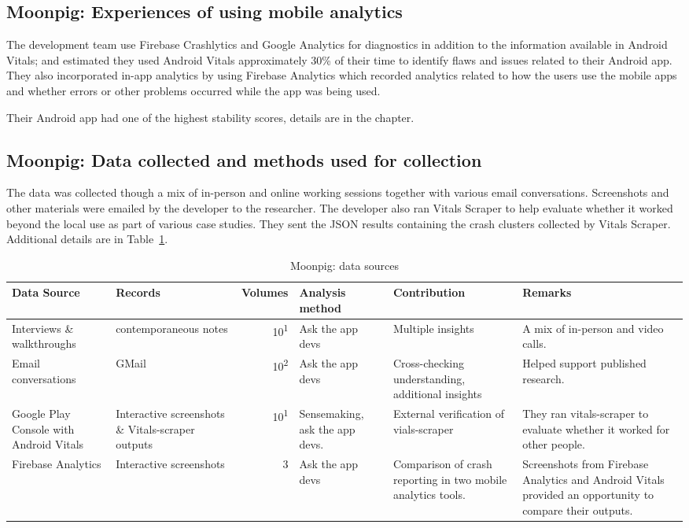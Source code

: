 \subsection{Moonpig: Experiences of using mobile analytics}
The development team use Firebase Crashlytics and Google Analytics for diagnostics in addition to the information available in Android Vitals; and estimated they used Android Vitals approximately 30\% of their time to identify flaws and issues related to their Android app.
%
They also incorporated in-app analytics by using Firebase Analytics which recorded analytics related to how the users use the mobile apps and whether errors or other problems occurred while the app was being used. 

Their Android app had one of the highest stability scores, details are in the  chapter.

\subsection{Moonpig: Data collected and methods used for collection}
The data was collected though a mix of in-person and online working sessions together with various email conversations. Screenshots and other materials were emailed by the developer to the researcher. 
%
The developer also ran Vitals Scraper to help evaluate whether it worked beyond the local use as part of various case studies. They sent the JSON results containing the crash clusters collected by Vitals Scraper. Additional details are in Table~\ref{tab:moonpig-data-sources}.

\begin{table}
    \centering
    \footnotesize
    \tabcolsep=0.12cm
    \begin{tabular}{p{2.2cm}p{2.3cm}rp{2.1cm}p{2.5cm}p{4cm}}
        Data Source & Records & Volumes & Analysis method & Contribution & Remarks \\
        \toprule
         Interviews \& walkthroughs & contemporaneous notes & 10\textsuperscript{1} & Ask the app devs & Multiple insights & A mix of in-person and video calls.  \\
         Email conversations & GMail & 10\textsuperscript{2} & Ask the app devs & Cross-checking understanding, additional insights & Helped support published research. \\
         Google Play Console with Android Vitals &Interactive screenshots \& Vitals-scraper outputs &10\textsuperscript{1} & Sensemaking, ask the app devs. & External verification of vials-scraper & They ran vitals-scraper to evaluate whether it worked for other people. \\
         Firebase Analytics & Interactive screenshots & 3 & Ask the app devs & Comparison of crash reporting in two mobile analytics tools. & Screenshots from Firebase Analytics and Android Vitals provided an opportunity to compare their outputs. \\
         \bottomrule
    \end{tabular}
    \caption{Moonpig: data sources}
    \label{tab:moonpig-data-sources}
\end{table}


